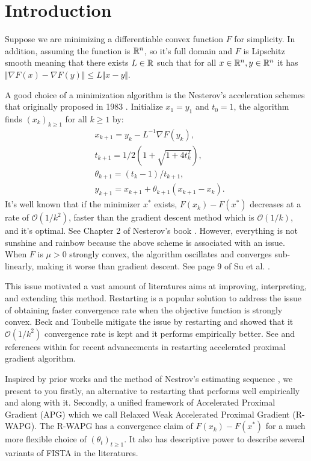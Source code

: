 \documentclass[12pt]{article}
\begin{document}
\section{Introduction}
    Suppose we are minimizing a differentiable convex function $F$ for simplicity. 
    In addition, assuming the function is $\mathbb R^n$, so it's full domain and $F$ is Lipschitz smooth meaning that there exists $L \in \mathbb R$ such that for all $x \in \mathbb R^n, y\in \mathbb R^n$ it has $\Vert \nabla F(x) - \nabla F(y)\Vert \le L \Vert x - y \Vert$. 
    \par 
    A good choice of a minimization algorithm is the Nesterov's acceleration schemes that originally proposed in 1983 \cite{nesterov_method_1983}. Initialize $x_1 = y_1$ and $t_0 = 1$, the algorithm finds $(x_k)_{k \ge 1}$ for all $k \ge 1$ by: 
    \begin{align}
        & x_{k + 1} = y_k - L^{-1}\nabla F(y_k), 
        \\
        & t_{k + 1} = 1/2\left(1 + \sqrt{1 + 4t_{k}^2}\right), 
        \\
        & \theta_{k + 1} = (t_{k} - 1)/t_{k + 1}, 
        \\
        & y_{k + 1} = x_{k + 1} + \theta_{k + 1}(x_{k + 1} - x_k). 
    \end{align}\label{eqn:example_algorithm}
    It's well known that if the minimizer $x^*$ exists, $F(x_k) - F(x^*)$ decreases at a rate of $\mathcal O(1/k^2)$, faster than the gradient descent method which is $\mathcal O(1/k)$, and it's optimal. 
    See Chapter 2 of Nesterov's book \cite{nesterov_lectures_2018}. 
    However, everything is not sunshine and rainbow because the above scheme is associated with an issue. 
    When $F$ is $\mu > 0$ strongly convex, the algorithm oscillates and converges sub-linearly, making it worse than gradient descent. See page 9 of Su et al. \cite{su_differential_2016}. 
    \par
    This issue motivated a vast amount of literatures aims at improving, interpreting, and extending this method. 
    Restarting is a popular solution to address the issue of obtaining faster convergence rate when the objective function is strongly convex. 
    Beck and Toubelle \cite{beck_fast_2009} mitigate the issue by restarting and showed that it $\mathcal O(1/k^2)$ convergence rate is kept and it performs empirically better. 
    See \cite{necoara_linear_2019}\cite{aujol_parameter-free_2024} and references within for recent advancements in restarting accelerated proximal gradient algorithm. 
    \par
    Inspired by prior works and the method of Nestrov's estimating sequence \cite{nesterov_lectures_2018}, we present to you firstly, an alternative to restarting that performs well empirically and along with it. 
    Secondly, a unified framework of Accelerated Proximal Gradient (APG) which we call Relaxed Weak Accelerated Proximal Gradient (R-WAPG). 
    The R-WAPG has a convergence claim of $F(x_k)- F(x^*)$ for a much more flexible choice of $(\theta_t)_{t \ge 1}$. 
    It also has descriptive power to describe several variants of FISTA in the literatures.  
\end{document}
